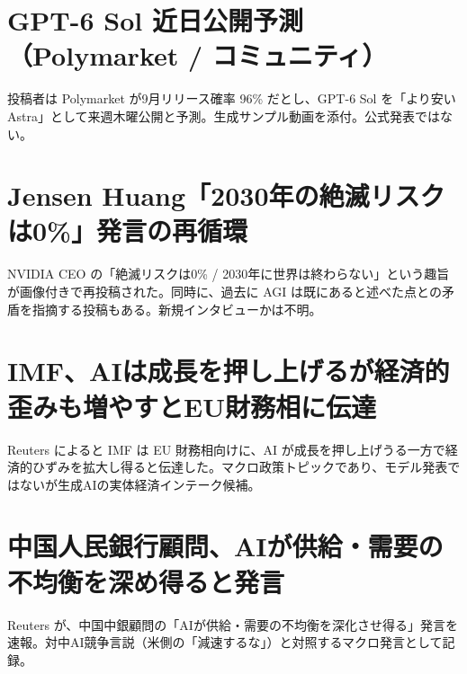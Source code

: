 \section{GPT-6 Sol 近日公開予測（Polymarket / コミュニティ）}
投稿者は Polymarket が9月リリース確率 96\% だとし、GPT-6 Sol を「より安い Astra」として来週木曜公開と予測。生成サンプル動画を添付。公式発表ではない。

\section{Jensen Huang「2030年の絶滅リスクは0\%」発言の再循環}
NVIDIA CEO の「絶滅リスクは0\% / 2030年に世界は終わらない」という趣旨が画像付きで再投稿された。同時に、過去に AGI は既にあると述べた点との矛盾を指摘する投稿もある。新規インタビューかは不明。

\section{IMF、AIは成長を押し上げるが経済的歪みも増やすとEU財務相に伝達}
Reuters によると IMF は EU 財務相向けに、AI が成長を押し上げうる一方で経済的ひずみを拡大し得ると伝達した。マクロ政策トピックであり、モデル発表ではないが生成AIの実体経済インテーク候補。

\section{中国人民銀行顧問、AIが供給・需要の不均衡を深め得ると発言}
Reuters が、中国中銀顧問の「AIが供給・需要の不均衡を深化させ得る」発言を速報。対中AI競争言説（米側の「減速するな」）と対照するマクロ発言として記録。
